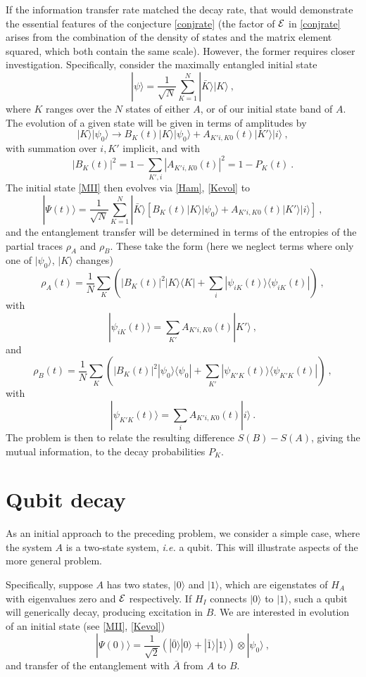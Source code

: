 \documentclass[aps,prd,groupedaddress,nofootinbib,letterpaper]{revtex4}
\newcommand{\cale}{{\cal E}}
\newcommand{\beq}{\begin{equation}}
\newcommand{\eeq}{\end{equation}}
\begin{document}
If the information transfer rate matched the decay rate, that would demonstrate the essential features of the conjecture \eqref{conjrate}
(the factor of $\cale$ in \eqref{conjrate} arises from the combination of the density of states and the matrix element squared, which both contain the same scale).
However, the former requires closer investigation.  
Specifically, consider the maximally entangled initial state
\beq\label{MII}
|\psi\rangle = \frac{1}{\sqrt N} \sum_{K=1}^N |\bar K\rangle |K\rangle\ ,
\eeq
where $K$ ranges over the $N$ states of either $A$, or of our initial state band of $A$.  The evolution of a given state will be given in terms of amplitudes by
\beq\label{Kevol}
|K\rangle |\psi_0\rangle\rightarrow B_K(t) |K\rangle|\psi_0\rangle + A_{K'i,K0}(t)|K'\rangle |i\rangle\ ,
\eeq
with summation over $i,K'$ implicit, and with
\beq
\left|B_K(t)\right|^2 = 1 - \sum_{K',i} \left|A_{K'i,K0}(t)\right|^2 = 1-P_K(t)\ .
\eeq
The initial state \eqref{MII} then evolves via \eqref{Ham}, \eqref{Kevol} to
\beq
|\Psi(t)\rangle = \frac{1}{\sqrt N} \sum_{K=1}^N |\bar K\rangle \left[B_K(t) |K\rangle|\psi_0\rangle + A_{K'i,K0}(t) |K'\rangle|i\rangle\right]\ ,
\eeq
and the entanglement transfer will be determined in terms of the entropies of the partial traces $\rho_A$ and $\rho_B$.  
These take the form (here we neglect terms where only one of $|\psi_0\rangle$, $|K\rangle$ changes)
\beq\label{rhoA}
\rho_A(t) = \frac{1}{N} \sum_K\left( |B_K(t)|^2 |K\rangle\langle K| + \sum_i |\psi_{iK}(t)\rangle\langle\psi_{iK}(t)|\right)\ ,
\eeq
with 
\beq  
|\psi_{iK}(t)\rangle = \sum_{K'} A_{K'i,K0}(t) |K'\rangle\ ,
\eeq
and
\beq\label{rhoB}
\rho_B(t) = \frac{1}{N} \sum_K\left( |B_K(t)|^2 |\psi_0\rangle\langle \psi_0| + \sum_{K'} |\psi_{K'K}(t)\rangle\langle\psi_{K'K}(t)|\right)\ ,
\eeq
with 
\beq
 |\psi_{K'K}(t)\rangle=\sum_i  A_{K'i,K0}(t) |i\rangle\ .
 \eeq
 The problem is then to relate the resulting difference $S(B)-S(A)$, giving the mutual information, to the decay probabilities $P_K$. 


\section{Qubit decay}

As an initial approach to the preceding problem, we consider a simple case, where the system $A$ is a two-state system, {\it i.e.} a qubit.  This will illustrate aspects of the more general problem.

Specifically, suppose $A$ has two states, $|0\rangle$ and $|1\rangle$, which are eigenstates of $H_A$ with eigenvalues zero and $\cale$ respectively.  If $H_I$ connects $|0\rangle$ to $|1\rangle$, such a qubit will generically decay, producing excitation in $B$.  We are interested in evolution of an initial state (see \eqref{MII}, \eqref{Kevol})
\beq
|\Psi(0)\rangle =  \frac{1}{\sqrt2}\left(|\bar0\rangle|0\rangle+|\bar1\rangle|1\rangle\right)\otimes |\psi_0\rangle\ ,
\eeq
and transfer of the entanglement with $\bar A$ from $A$ to $B$.
\end{document}
